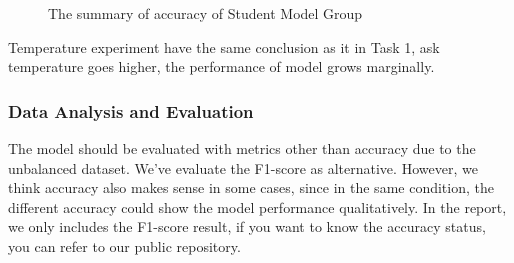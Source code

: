\documentclass[conference]{IEEEtran}
\begin{document}
\begin{figure}[h]
		\centering  %
		\caption{The summary of accuracy of Student Model Group}
		\label{sum}
	\end{figure}
Temperature experiment have the same conclusion as it in Task 1, ask temperature goes higher, the performance of model grows marginally.

\subsubsection{Data Analysis and Evaluation}

The model should be evaluated with metrics other than accuracy due to the unbalanced dataset. We've evaluate the F1-score as alternative. However, we think accuracy also makes sense in some cases, since in the same condition, the different accuracy could show the model performance qualitatively. In the report, we only includes the F1-score result, if you want to know the accuracy status, you can refer to our public repository.
\end{document}
